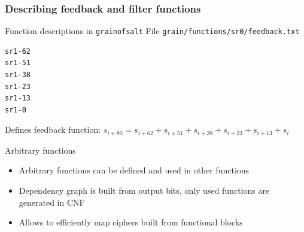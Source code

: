 \documentclass[xcolor=usenames,xcolor=svgnames,table,slidestop,compress,mathserif]{beamer}
\begin{document}
{%
}

\begin{frame}[fragile]
\frametitle{Describing feedback and filter functions}

\begin{beamerboxesrounded}[shadow=true]{Function descriptions in \texttt{grainofsalt}}
File \texttt{grain/functions/sr0/feedback.txt}
{\small\begin{verbatim}
sr1-62
sr1-51
sr1-38
sr1-23
sr1-13
sr1-0
\end{verbatim}}
Defines feedback function:
$s_{i+80} = s_{i+62} + s_{i+51} + s_{i+38} + s_{i+23} + s_{i+13} + s_i$
\end{beamerboxesrounded}

\begin{beamerboxesrounded}[shadow=true]{Arbitrary functions}
\begin{itemize}
 \item Arbitrary functions can be defined and used in other functions
 \item Dependency graph is built from output bits, only used functions are generated in CNF
 \item Allows to efficiently map ciphers built from functional blocks
\end{itemize}
\end{beamerboxesrounded}
\end{frame}

\end{document}
